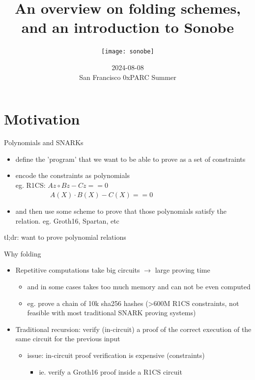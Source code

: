 \documentclass[t]{beamer}
\title{An overview on folding schemes,\\and an introduction to Sonobe}
\author{
  \vspace{0.2cm}
  \texttt{[image: sonobe]}
}
\date{\vspace{0.1cm}\scriptsize{2024-08-08\\San Francisco 0xPARC Summer}}
\begin{document}
\frame{\titlepage}



\section[Motivation]{Motivation}

\begin{frame}{Polynomials and SNARKs}
  \begin{itemize}
    \item define the 'program' that we want to be able to prove as a set of constraints
    \item encode the constraints as polynomials
    \\eg. R1CS: $Az \circ Bz - Cz == 0$
    \\~~~~~~~~~~$A(X) \cdot B(X) - C(X) == 0$
    \item and then use some scheme to prove that those polynomials satisfy the relation. eg. Groth16, Spartan, etc
  \end{itemize}
  tl;dr: want to prove polynomial relations
\end{frame}

\begin{frame}{Why folding}
  \begin{itemize}
    \item Repetitive computations take big circuits $\longrightarrow$ large proving time
    \begin{itemize}
      \item and in some cases takes too much memory and can not be even computed
      \item eg. prove a chain of 10k sha256 hashes (>600M R1CS constraints, not feasible with most traditional SNARK proving systems)
    \end{itemize}


    \item Traditional recursion: verify (in-circuit) a proof of the correct execution of the same circuit for the previous input
    \begin{itemize}
      \item issue: in-circuit proof verification is expensive (constraints)
      \begin{itemize}
        \item ie. verify a Groth16 proof inside a R1CS circuit
      \end{itemize}
    \end{itemize}
  \end{itemize}

\end{frame}
\end{document}
